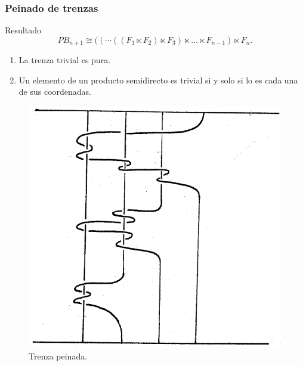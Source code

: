 \documentclass{beamer}
\theoremstyle{definition}
\begin{document}
\begin{frame}
\frametitle{Peinado de trenzas}
\begin{block}{Resultado}
$$PB_{n+1}\cong ((\cdots ((F_1\ltimes F_2)\ltimes F_3)\ltimes\dots\ltimes F_{n-1})\ltimes F_n.$$
\end{block}

\begin{enumerate}
\item<2-> La trenza trivial es pura.
\item<3-> Un elemento de un producto semidirecto es trivial si y solo si lo es cada una de sus coordenadas.
\end{enumerate}
\end{frame}

%

\begin{frame}


\begin{figure}
\begin{turn}{1.5}
\includegraphics[scale=0.4]{Imagenes/peinado}
\end{turn}
\caption{Trenza peinada.}
\end{figure}

\end{frame}
\end{document}

